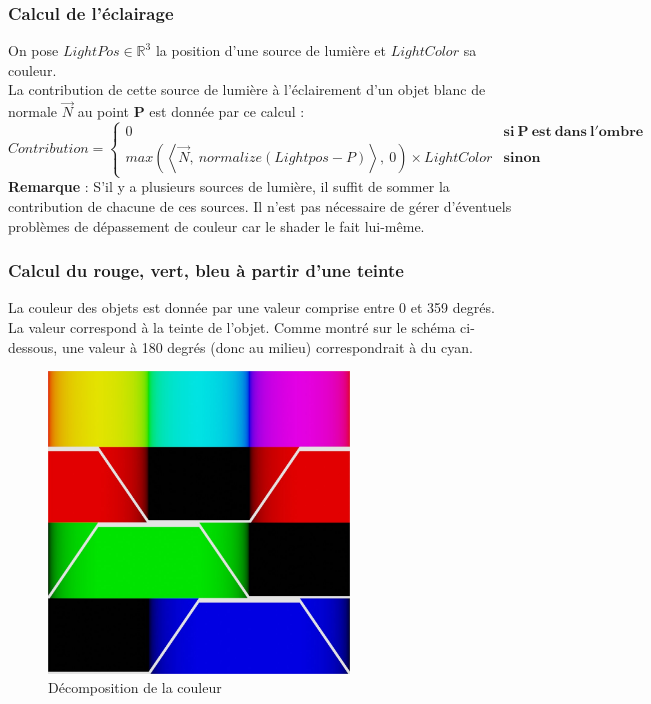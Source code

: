 \subsubsection{Calcul de l'éclairage}
On pose $LightPos \in \mathbb{R}^3$ la position d'une source de lumière et $LightColor$ sa couleur.
\\La contribution de cette source de lumière à l'éclairement d'un objet blanc de normale $\Vec{N}$ au point $\mathbf{P}$ est donnée par ce calcul :
$$
    Contribution=\left\{
        \begin{array}{ll}
            0 & \mathbf{si\ P\ est\ dans\ l'ombre} \\
            max(\left\langle \Vec{N},\ normalize(Lightpos-P) \right\rangle,\ 0) \times LightColor & \mathbf{sinon}
        \end{array}
    \right.
$$
\textbf{Remarque} : S'il y a plusieurs sources de lumière, il suffit de sommer la contribution de chacune de ces sources. Il n'est pas nécessaire de gérer d'éventuels problèmes de dépassement de couleur car le shader le fait lui-même.

\newpage
\subsubsection{Calcul du rouge, vert, bleu à partir d'une teinte}

La couleur des objets est donnée par une valeur comprise entre 0 et 359 degrés. La valeur correspond à la teinte de l'objet. Comme montré sur le schéma ci-dessous, une valeur à 180 degrés (donc au milieu) correspondrait à du cyan.

\begin{figure}[h]
    \centering
    \includegraphics[width=8cm]{images/huetorgb.jpg}
    \caption{Décomposition de la couleur }\label{fig:huetorgb}
\end{figure}

